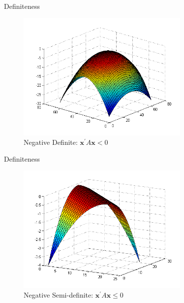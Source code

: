 \documentclass[11pt, xcolor={dvipsnames}, hyperref={colorlinks, allcolors=Blue}]{beamer}
\begin{document}
\begin{frame}{Definiteness}
\begin{figure}
	\centering
	\includegraphics[width=0.75\textwidth]{quadraticform2.png}
	\caption{Negative Definite: $\mathbf{x}^{\prime}A\mathbf{x} < 0$}
\end{figure}
\end{frame}

\begin{frame}{Definiteness}
\begin{figure}
	\centering
	\includegraphics[width=0.75\textwidth]{quadraticform5.png}
	\caption{Negative Semi-definite: $\mathbf{x}^{\prime}A\mathbf{x} \leq 0$}
\end{figure}
\end{frame}
\end{document}
